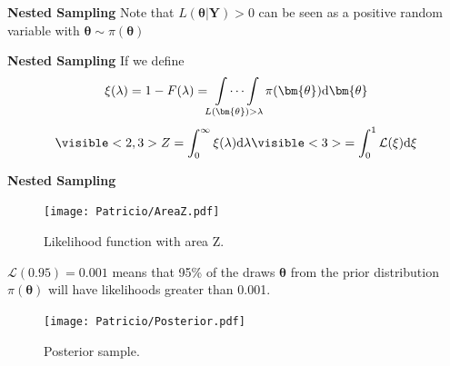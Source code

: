 \begin{frame}{\small{\textbf{Nested Sampling}}}
Note that $L(\bm\theta | \bm Y ) > 0$ can be seen as a positive random variable with $\bm \theta \sim \pi(\bm\theta)$
\end{frame}
\begin{frame}{\small{\textbf{Nested Sampling}}}
If we define
\begin{align*}
	\xi(\lambda) = 1-F(\lambda) = \idotsint \limits_{L (\bm{\theta})> \lambda} \pi(\bm{\theta}) \text{d} \bm{\theta} \\
\end{align*}
\begin{align*}
\visible<2,3>{	Z = \int_{0}^{\infty} \xi(\lambda)\text{d}\lambda }
	\visible<3>{= \int_{0}^{1} \mathcal L (\xi) \text{d}\xi}
\end{align*}
\end{frame}
\begin{frame}{\small{\textbf{Nested Sampling}}}
\begin{overprint}
	\begin{figure}
		\texttt{[image: Patricio/AreaZ.pdf]}
	\caption{Likelihood function with area Z.}
	\end{figure}
	$\mathcal L (0.95) = 0.001$ means that 95\% of the draws $\bm\theta$ from the prior distribution $\pi(\bm\theta)$ will have likelihoods greater than 0.001.		
\begin{figure}
	\texttt{[image: Patricio/Posterior.pdf]}
	\caption{Posterior sample.}
\end{figure}	
\end{overprint}
\end{frame}
